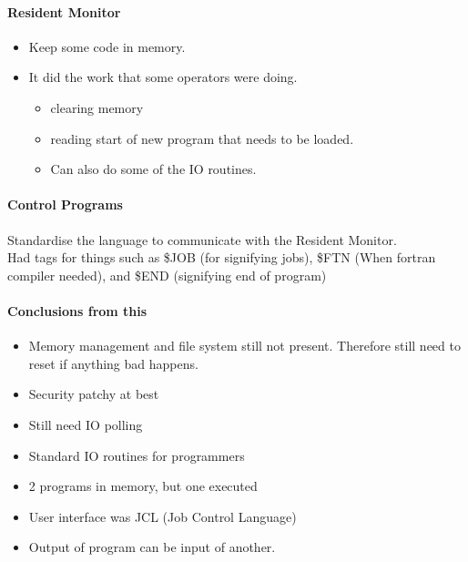 \documentclass{article}
\newcommand\tab[1][0.5cm]{\hspace*{#1}}
\begin{document}
		\paragraph{\tab Resident Monitor}
		\begin{itemize}
			\item Keep some code in memory.
			\item It did the work that some operators were doing.
			\begin{itemize}
				\item clearing memory
				\item reading start of new program that needs to be loaded.
				\item Can also do some of the IO routines.
			\end{itemize}
		\end{itemize}

		\paragraph{\tab Control Programs}
		Standardise the language to communicate with the Resident Monitor.
		\\ Had tags for things such as \$JOB (for signifying jobs), \$FTN (When fortran compiler needed), and \$END (signifying end of program)

		\paragraph{Conclusions from this}
		\begin{itemize}
			\item Memory management and file system still not present. Therefore still need to reset if anything bad happens.
			\item Security patchy at best
			\item Still need IO polling
			\item Standard IO routines for programmers
			\item 2 programs in memory, but one executed
			\item User interface was JCL (Job Control Language)
			\item Output of program can be input of another.
		\end{itemize}
\end{document}
